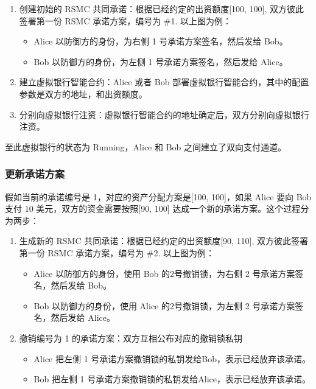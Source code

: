 \begin{appendices}
\begin{enumerate}
    \item 创建初始的 RSMC 共同承诺：根据已经约定的出资额度[100, 100], 双方彼此签署第一份 RSMC 承诺方案，编号为 \#1. 以上图为例：
        \begin{itemize}
        \item Alice 以防御方的身份，为右侧 1 号承诺方案签名，然后发给 Bob。
        \item Bob 以防御方的身份，为左侧 1 号承诺方案签名，然后发给 Alice。
        \end{itemize}

    \item 建立虚拟银行智能合约：Alice 或者 Bob 部署虚拟银行智能合约，其中的配置参数是双方的地址，和出资额度。
    \item 分别向虚拟银行注资：虚拟银行智能合约的地址确定后，双方分别向虚拟银行注资。
\end{enumerate}


至此虚拟银行的状态为 Running，Alice 和 Bob 之间建立了双向支付通道。

\subsubsection{更新承诺方案}

假如当前的承诺编号是 1，对应的资产分配方案是[100, 100]，如果 Alice 要向 Bob 支付 10 美元，双方的资金需要按照[90, 100] 达成一个新的承诺方案。这个过程分为两步：
\begin{enumerate}

    \item 生成新的 RSMC 共同承诺：根据已经约定的出资额度[90, 110], 双方彼此签署第一份 RSMC 承诺方案，编号为 \#2. 以上图为例：
        \begin{itemize}
            \item Alice 以防御方的身份，使用 Bob 的2号撤销锁，为右侧 2 号承诺方案签名，然后发给 Bob。
            \item Bob 以防御方的身份，使用 Alice 的2号撤销锁，为左侧 2 号承诺方案签名，然后发给 Alice。
        \end{itemize}

    \item 撤销编号为 1 的承诺方案：双方互相公布对应的撤销锁私钥
        \begin{itemize}
            \item Alice 把左侧 1 号承诺方案撤销锁的私钥发给Bob，表示已经放弃该承诺。
            \item Bob 把左侧 1 号承诺方案撤销锁的私钥发给Alice，表示已经放弃该承诺。
        \end{itemize}
\end{enumerate}


\end{appendices}
